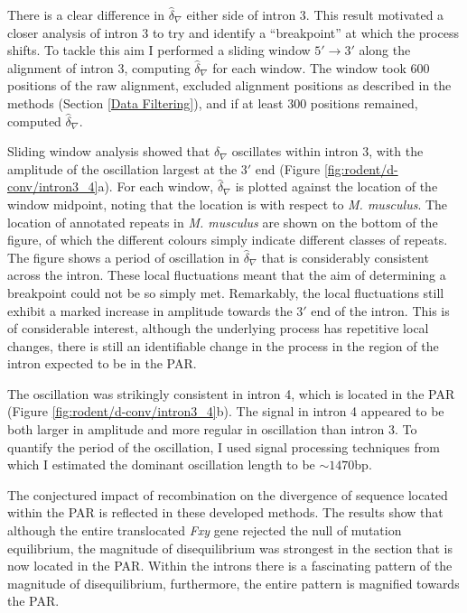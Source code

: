

There is a clear difference in $\hat \delta_\nabla$ either side of intron 3. This result motivated a closer analysis of intron 3 to try and identify a ``breakpoint'' at which the process shifts. To tackle this aim I performed a sliding window $5' \rightarrow 3'$ along the alignment of intron 3, computing $\hat \delta_\nabla$ for each window. The window took $600$ positions of the raw alignment, excluded alignment positions as described in the methods (Section \ref{Data Filtering}), and if at least 300 positions remained, computed $\hat \delta_\nabla$. 

Sliding window analysis showed that $\delta_\nabla$ oscillates within intron 3, with the amplitude of the oscillation largest at the $3'$ end (Figure \ref{fig:rodent/d-conv/intron3_4}a). For each window, $\hat \delta_\nabla$ is plotted against the location of the window midpoint, noting that the location is with respect to \textit{M. musculus}. The location of annotated repeats in \textit{M. musculus} are shown on the bottom of the figure, of which the different colours simply indicate different classes of repeats. The figure shows a period of oscillation in $\hat \delta_\nabla$ that is considerably consistent across the intron. These local fluctuations meant that the aim of determining a breakpoint could not be so simply met. Remarkably, the local fluctuations still exhibit a marked increase in amplitude towards the $3'$ end of the intron. This is of considerable interest, although the underlying process has repetitive local changes, there is still an identifiable change in the process in the region of the intron expected to be in the PAR. 

The oscillation was strikingly consistent in intron 4, which is located in the PAR (Figure \ref{fig:rodent/d-conv/intron3_4}b). The signal in intron 4 appeared to be both larger in amplitude and more regular in oscillation than intron 3. To quantify the period of the oscillation, I used signal processing techniques from which I estimated the dominant oscillation length to be $\sim1470$bp. 



The conjectured impact of recombination on the divergence of sequence located within the PAR is reflected in these developed methods. The results show that although the entire translocated \textit{Fxy} gene rejected the null of mutation equilibrium, the magnitude of disequilibrium was strongest in the section that is now located in the PAR. Within the introns there is a fascinating pattern of the magnitude of disequilibrium, furthermore, the entire pattern is magnified towards the PAR. 

